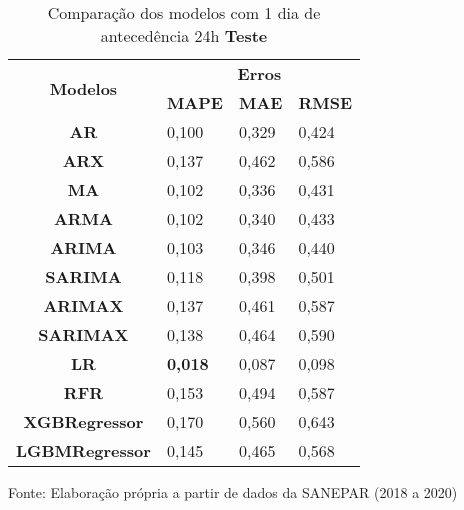 \begin{table}[H]
	\centering
	\caption{Comparação dos modelos com 1 dia de antecedência 24h \textbf{Teste} }\label{tb:1-24tst}
	\begin{tabular}{@{}clll@{}}
		\toprule
		\multirow{2}{*}{\textbf{Modelos}} & \multicolumn{3}{c}{\textbf{Erros}}                                                                       \\ \cmidrule(l){2-4} 
		& \multicolumn{1}{c}{\textbf{MAPE}} & \multicolumn{1}{c}{\textbf{MAE}} & \multicolumn{1}{c}{\textbf{RMSE}} \\ \hline
\textbf{AR}                       & 0,100                             & 0,329                            & 0,424                             \\
\textbf{ARX}                      & 0,137                             & 0,462                            & 0,586                             \\
\textbf{MA}                       & 0,102                             & 0,336                            & 0,431                             \\
\textbf{ARMA}                     & 0,102                             & 0,340                            & 0,433                             \\
\textbf{ARIMA}                    & 0,103                             & 0,346                            & 0,440                             \\
\textbf{SARIMA}                   & 0,118                             & 0,398                            & 0,501                             \\
\textbf{ARIMAX}                   & 0,137                             & 0,461                            & 0,587                             \\
\textbf{SARIMAX}                  & 0,138                             & 0,464                            & 0,590                             \\
\textbf{LR}                       & \textbf{0,018}                             & 0,087                            & 0,098                             \\
\textbf{RFR}                      & 0,153                             & 0,494                            & 0,587                             \\
\textbf{XGBRegressor}             & 0,170                             & 0,560                            & 0,643                             \\
\textbf{LGBMRegressor}            & 0,145                             & 0,465                            & 0,568                             \\ \bottomrule
	\end{tabular}

Fonte: Elaboração própria a partir de dados da SANEPAR (2018 a 2020)
\end{table}

